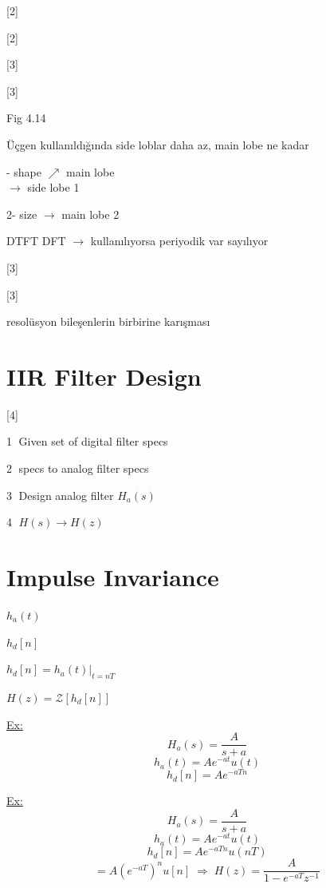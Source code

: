 \documentclass[11pt,a4paper]{article}
\begin{document}
[2]

[2]

[3]

[3]

Fig 4.14

Üçgen kullanıldığında side loblar daha az, main lobe ne kadar 

- shape $\nearrow$ main lobe\\
\hspace*{3.6em}$\rightarrow$ side lobe \textcircled{1}

2- size $\rightarrow$ main lobe \textcircled{2}

DTFT \quad DFT $\rightarrow$ kullanılıyorsa periyodik var sayılıyor

[3]

[3]

resolüsyon bileşenlerin birbirine karışması

\section{IIR Filter Design}

[4]

\textcircled{1} Given set of digital filter specs

\textcircled{2}  specs to analog filter specs

\textcircled{3} Design analog filter $H_a(s)$

\textcircled{4}  $H(s) \rightarrow H(z)$

\section{Impulse Invariance}

$h_a(t)$

$h_d[n]$

$h_d[n] = h_a(t)\big|_{t=nT}$

$H(z) = \mathcal{Z}[h_d[n]]$

\underline{Ex:}
\[ H_a(s) = \frac{A}{s+a} \]
\[ h_a(t) = A e^{-at} u(t) \]
\[ h_d[n] = A e^{-aTn} \]

\underline{Ex:}
\[ H_a(s) = \frac{A}{s+a} \]
\[ h_a(t) = A e^{-at} u(t) \]
\[ h_d[n] = A e^{-aTn} u(nT) \]
\[ {}= A (e^{-aT})^n u[n] \;\Longrightarrow\; H(z) = \frac{A}{1 - e^{-aT} z^{-1}} \]
\end{document}
